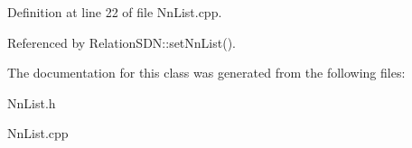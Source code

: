 Definition at line 22 of file NnList.cpp.

Referenced by RelationSDN::setNnList().

The documentation for this class was generated from the following files:\begin{DoxyCompactItemize}
\item 
NnList.h\item 
NnList.cpp\end{DoxyCompactItemize}
